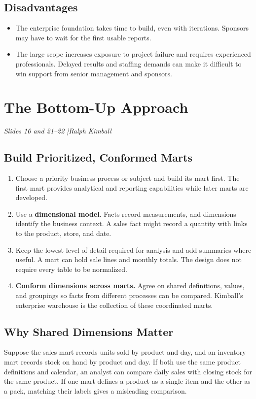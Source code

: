 \documentclass[12pt,a4paper]{article}
\newcommand{\slides}[1]{\textit{\small #1}\par}
\begin{document}
\subsection{Disadvantages}
\begin{itemize}
\item The enterprise foundation takes time to build, even with iterations. Sponsors may have to wait for the first usable reports.
\item The large scope increases exposure to project failure and requires experienced professionals. Delayed results and staffing demands can make it difficult to win support from senior management and sponsors.
\end{itemize}

\newpage
\section{The Bottom-Up Approach}
\slides{Slides 16 and 21--22 \quad|\quad Ralph Kimball}
\subsection{Build Prioritized, Conformed Marts}
\begin{enumerate}
\item Choose a priority business process or subject and build its mart first. The first mart provides analytical and reporting capabilities while later marts are developed.
\item Use a \textbf{dimensional model}. Facts record measurements, and dimensions identify the business context. A sales fact might record a quantity with links to the product, store, and date.
\item Keep the lowest level of detail required for analysis and add summaries where useful. A mart can hold sale lines and monthly totals. The design does not require every table to be normalized.
\item \textbf{Conform dimensions across marts.} Agree on shared definitions, values, and groupings so facts from different processes can be compared. Kimball's enterprise warehouse is the collection of these coordinated marts.
\end{enumerate}

\subsection{Why Shared Dimensions Matter}
Suppose the sales mart records units sold by product and day, and an inventory mart records stock on hand by product and day. If both use the same product definitions and calendar, an analyst can compare daily sales with closing stock for the same product. If one mart defines a product as a single item and the other as a pack, matching their labels gives a misleading comparison.
\end{document}
